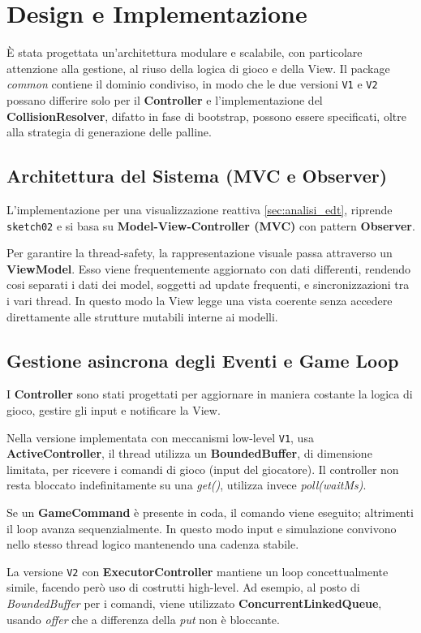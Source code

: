\section{Design e Implementazione}
È stata progettata un'architettura modulare e scalabile, con particolare attenzione alla gestione, al riuso della logica di gioco e della View.
Il package \emph{common} contiene il dominio condiviso, in modo che le due versioni \texttt{V1} e \texttt{V2} possano differire solo per il \textbf{Controller} e l'implementazione del \textbf{CollisionResolver}, difatto in fase di bootstrap, possono essere specificati, oltre alla strategia di generazione delle palline.

\subsection{Architettura del Sistema (MVC e Observer)}
L'implementazione per una visualizzazione reattiva \ref{sec:analisi_edt}, riprende \texttt{sketch02} e si basa su \textbf{Model-View-Controller (MVC)} con pattern \textbf{Observer}.

Per garantire la thread-safety, la rappresentazione visuale passa attraverso un \textbf{ViewModel}. Esso viene frequentemente aggiornato con dati differenti, rendendo cosi separati i dati dei model, soggetti ad update frequenti, e sincronizzazioni tra i vari thread.
In questo modo la View legge una vista coerente senza accedere direttamente alle strutture mutabili interne ai modelli.

\subsection{Gestione asincrona degli Eventi e Game Loop}
I \textbf{Controller} sono stati progettati per aggiornare in maniera costante la logica di gioco, gestire gli input e notificare la View.

Nella versione implementata con meccanismi low-level \texttt{V1}, usa \textbf{ActiveController}, il thread utilizza un \textbf{BoundedBuffer}, di dimensione limitata, per ricevere i comandi di gioco (input del giocatore).
Il controller non resta bloccato indefinitamente su una \emph{get()}, utilizza invece \emph{poll(waitMs)}.

Se un \textbf{GameCommand} è presente in coda, il comando viene eseguito; altrimenti il loop avanza sequenzialmente. In questo modo input e simulazione convivono nello stesso thread logico mantenendo una cadenza stabile.

La versione \texttt{V2} con \textbf{ExecutorController} mantiene un loop concettualmente simile, facendo però uso di costrutti high-level.
Ad esempio, al posto di \emph{BoundedBuffer} per i comandi, viene utilizzato \textbf{ConcurrentLinkedQueue}, usando \emph{offer} che a differenza della \emph{put} non è bloccante.

